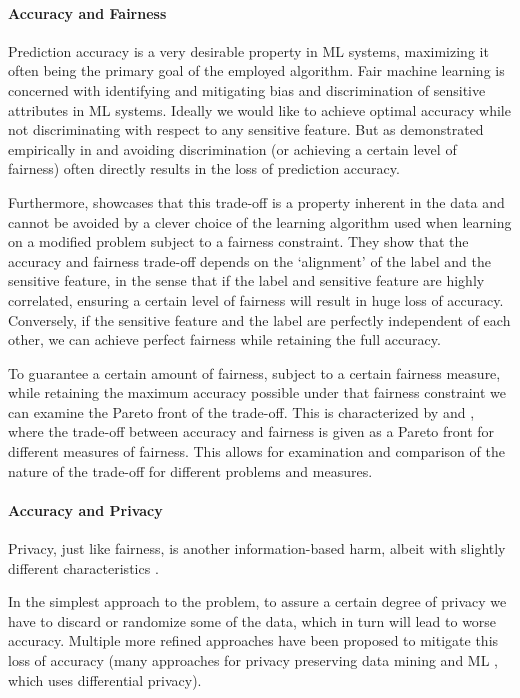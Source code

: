 	\paragraph{Accuracy and Fairness}
	Prediction accuracy is a very desirable property in ML systems, maximizing it often being the primary goal of the employed algorithm.
	Fair machine learning is concerned with identifying and mitigating bias and discrimination of sensitive attributes in ML systems.
	Ideally we would like to achieve optimal accuracy while not discriminating with respect to any sensitive feature.
	But as demonstrated empirically in \eg \cite{kamiran2010discrimination} and \cite{zliobaite2015relation} avoiding discrimination (or achieving a certain level of fairness) often directly results in the loss of prediction accuracy.

	Furthermore, \cite{menon2018cost} showcases that this trade-off is a property inherent in the data and cannot be avoided by a clever choice of the learning algorithm used when learning on a modified problem subject to a fairness constraint.
	They show that the accuracy and fairness trade-off depends on the `alignment' of the label and the sensitive feature, in the sense that if the label and sensitive feature are highly correlated, ensuring a certain level of fairness will result in huge loss of accuracy.
	Conversely, if the sensitive feature and the label are perfectly independent of each other, we can achieve perfect fairness while retaining the full accuracy.

	To guarantee a certain amount of fairness, subject to a certain fairness measure, while retaining the maximum accuracy possible under that fairness constraint we can examine the Pareto front of the trade-off. 	
	This is characterized by \cite{liu2020accuracy} and \cite{wei2020fairness}, where the trade-off between accuracy and fairness is given as a Pareto front for different measures of fairness.
	This allows for examination and comparison of the nature of the trade-off for different problems and measures.
	

	\paragraph{Accuracy and Privacy}
	Privacy, just like fairness, is another information-based harm, albeit with slightly different characteristics \cite{van2008information}.

	In the simplest approach to the problem, to assure a certain degree of privacy we have to discard or randomize some of the data, which in turn will lead to worse accuracy.
	Multiple more refined approaches have been proposed to mitigate this loss of accuracy (many approaches for privacy preserving data mining and ML \eg \cite{duchi2014privacy}, which uses differential privacy).


